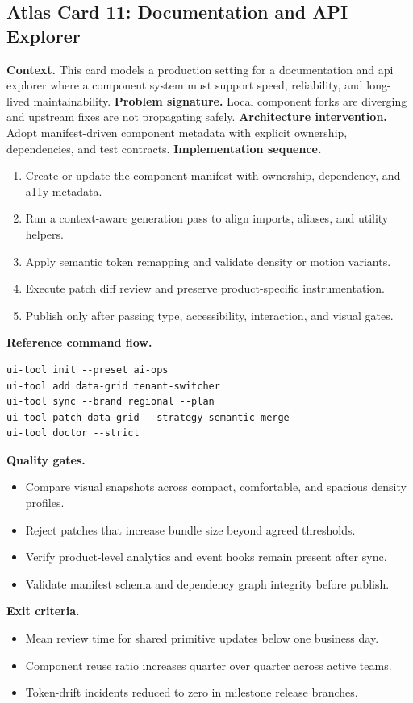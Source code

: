 \subsection*{Atlas Card 11: Documentation and API Explorer}
\textbf{Context.} This card models a production setting for a documentation and api explorer where a component system must support speed, reliability, and long-lived maintainability.
\textbf{Problem signature.} Local component forks are diverging and upstream fixes are not propagating safely.
\textbf{Architecture intervention.} Adopt manifest-driven component metadata with explicit ownership, dependencies, and test contracts.
\textbf{Implementation sequence.}
\begin{enumerate}[leftmargin=*, itemsep=0.28em]
  \item Create or update the component manifest with ownership, dependency, and a11y metadata.
  \item Run a context-aware generation pass to align imports, aliases, and utility helpers.
  \item Apply semantic token remapping and validate density or motion variants.
  \item Execute patch diff review and preserve product-specific instrumentation.
  \item Publish only after passing type, accessibility, interaction, and visual gates.
\end{enumerate}
\textbf{Reference command flow.}
\begin{verbatim}
ui-tool init --preset ai-ops
ui-tool add data-grid tenant-switcher
ui-tool sync --brand regional --plan
ui-tool patch data-grid --strategy semantic-merge
ui-tool doctor --strict
\end{verbatim}
\textbf{Quality gates.}
\begin{itemize}[leftmargin=*, itemsep=0.24em]
  \item Compare visual snapshots across compact, comfortable, and spacious density profiles.
  \item Reject patches that increase bundle size beyond agreed thresholds.
  \item Verify product-level analytics and event hooks remain present after sync.
  \item Validate manifest schema and dependency graph integrity before publish.
\end{itemize}
\textbf{Exit criteria.}
\begin{itemize}[leftmargin=*, itemsep=0.24em]
  \item Mean review time for shared primitive updates below one business day.
  \item Component reuse ratio increases quarter over quarter across active teams.
  \item Token-drift incidents reduced to zero in milestone release branches.
\end{itemize}
\clearpage
